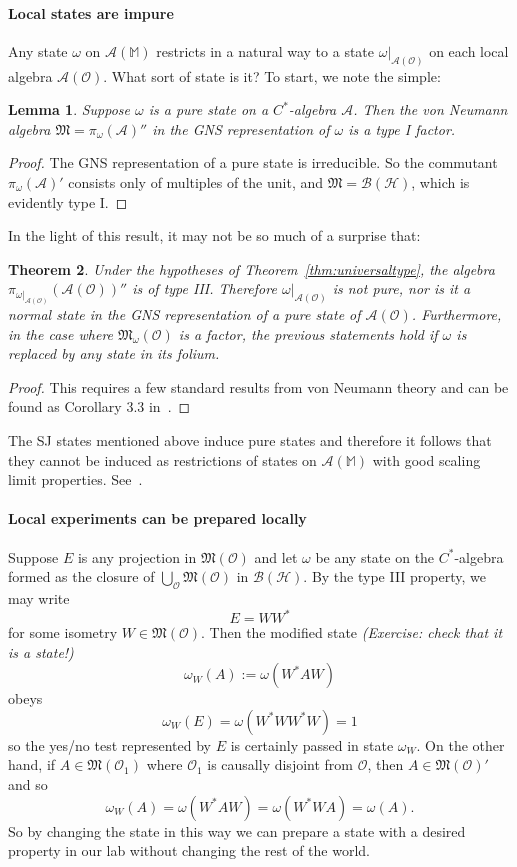 \documentclass[12pt,a4paper]{article}
\newcommand{\1}{\mathds{1}}                         %
\newcommand{\Ocal}{\mathcal{O}}
\newcommand{\MM}{\mathbb{M}}
\newcommand{\BB}{{\mathcal{B}}}
\newcommand{\HH}{{\mathcal{H}}}
\newcommand{\Mf}{{\mathfrak{M}}}
\newcommand{\Ac}{{\mathcal{A}}}
\newtheorem{theorem}{Theorem}%
\newtheorem{lemma}[theorem]{Lemma}
\begin{document}
\paragraph{Local states are impure} Any state $\omega$ on $\Ac(\MM)$ restricts in a natural way to a state $\omega|_{\Ac(\Ocal)}$ on each local algebra $\Ac(\Ocal)$. 
What sort of state is it? To start, we note the simple:
\begin{lemma}
	Suppose $\omega$ is a pure state on a $C^*$-algebra $\Ac$. Then the von Neumann algebra $\Mf=\pi_\omega(\Ac)''$ in the GNS representation of $\omega$ is a type I factor. 
\end{lemma}
\begin{proof}
The GNS representation of a pure state is irreducible. So the commutant $\pi_\omega(\Ac)'$ consists only of multiples of the unit, and $\Mf=\BB(\HH)$,
which is evidently type I.
\end{proof}
In the light of this result, it may not be so much of a surprise that:
\begin{theorem}
	Under the hypotheses of Theorem~\ref{thm:universaltype}, the algebra
	$\pi_{\omega|_{\Ac(\Ocal)}}(\Ac(\Ocal))''$ is of type III. Therefore $\omega|_{\Ac(\Ocal)}$ is not pure, nor is it a normal state in the GNS representation of a pure state of $\Ac(\Ocal)$. 
	Furthermore, in the case where $\Mf_\omega(\Ocal)$ is a factor, the previous statements
	hold if $\omega$ is replaced by any state in its folium. 
\end{theorem}
\begin{proof} This requires a few standard results from von Neumann theory and can be found as Corollary 3.3 in~\cite{FewsterVerch:2013}.
\end{proof}
The SJ states mentioned above induce pure states and therefore it follows that they cannot be induced as restrictions of states on $\Ac(\MM)$ with good scaling limit properties. See~\cite{FewsterVerch:2013}. 

\paragraph{Local experiments can be prepared locally} 
Suppose $E$ is any projection in $\Mf(\Ocal)$ and let $\omega$ be any state
on the $C^*$-algebra formed as the closure of $\bigcup_{\Ocal}\Mf(\Ocal)$ in $\BB(\HH)$. By the type III property, we may write
\[
E= WW^*
\]
for some isometry $W\in\Mf(\Ocal)$. Then the modified state \emph{(Exercise: check that it is a state!)}
\[
\omega_W(A):= \omega(W^* A W)
\]
obeys
\[
\omega_W(E) = \omega(W^*WW^*W) =1
\]
so the yes/no test represented by $E$ is certainly passed in state $\omega_W$.
On the other hand, if $A\in\Mf(\Ocal_1)$ where $\Ocal_1$ is causally disjoint from $\Ocal$, then 
$A\in\Mf(\Ocal)'$ and so
\[
\omega_W(A) = \omega(W^*AW) = \omega(W^*WA) = \omega(A).
\]
So by changing the state in this way we can prepare a state with a desired property in our lab without changing the rest of the world.
\end{document}
